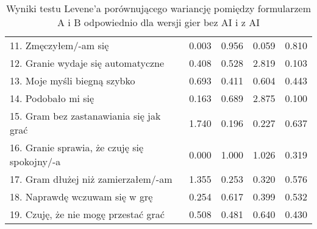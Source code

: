 \begin{table}[h!]
\begin{center}
\begin{tabular}{|m{10em}|m{5em}|m{5em}|m{5em}|m{5em}|}
            11. Zmęczyłem/-am się                                             & 0.003                       & 0.956            & 0.059                   & 0.810        \\
            12. Granie wydaje się automatyczne                                & 0.408                       & 0.528            & 2.819                   & 0.103        \\
            13. Moje myśli \newline biegną szybko                             & 0.693                       & 0.411            & 0.604                   & 0.443        \\
            14. Podobało mi się                                               & 0.163                       & 0.689            & 2.875                   & 0.100        \\
            15. Gram bez zastanawiania się jak grać                           & 1.740                       & 0.196            & 0.227                   & 0.637        \\
            16. Granie sprawia, \newline że czuję się spokojny/-a             & 0.000                       & 1.000            & 1.026                   & 0.319        \\
            17. Gram dłużej \newline niż zamierzałem/-am                      & 1.355                       & 0.253            & 0.320                   & 0.576        \\
            18. Naprawdę wczuwam się w grę                                    & 0.254                       & 0.617            & 0.399                   & 0.532        \\
            19. Czuję, że nie mogę przestać grać                              & 0.508                       & 0.481            & 0.640                   & 0.430        \\
            \hline
        \end{tabular}
    \end{center}
    \caption{Wyniki testu Levene'a porównującego wariancję pomiędzy formularzem A i B odpowiednio dla wersji gier bez AI i z AI}\label{tab1:ch7_12}
\end{table}



